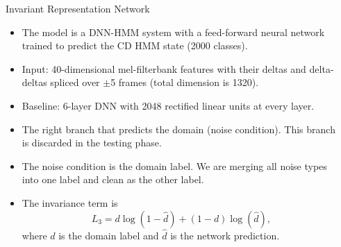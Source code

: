 \documentclass[final]{beamer}
\newlength{\sepwid}
\newlength{\onecolwid}
\newlength{\twocolwid}
\begin{document}
\begin{frame}[t]
\begin{columns}[t]
\begin{column}{\twocolwid}
\begin{columns}[t]
\begin{column}{\onecolwid}
\begin{block}{{\Large Invariant Representation Network}}
                \begin{itemize}
                    \item The model is a DNN-HMM system with a feed-forward neural network trained to predict the 
                        CD HMM state (2000 classes).
                    \item Input: 40-dimensional mel-filterbank features with their deltas and 
                        delta-deltas spliced over $\pm$5 frames (total dimension is 1320).
                    \item Baseline: 6-layer DNN with 2048 rectified linear units at every layer.
                    \item The right branch that predicts the domain (noise condition). This branch is discarded 
                        in the testing phase. 
                    \item The noise condition is the domain label. We are merging all noise types into one label
                        and clean as the other label.
                    \item The invariance term is
                        \begin{equation*}
                            L_3 = d\log(1 - \hat{d}) + (1-d)\log(\hat{d}),
                        \end{equation*}
                        where $d$ is the domain label and $\hat{d}$ is the network prediction.
                \end{itemize}
            \end{block}

        \end{column} %

        \begin{column}{\sepwid}\end{column} %


\end{columns}
\end{column}
\end{columns}
\end{frame}
\end{document}
